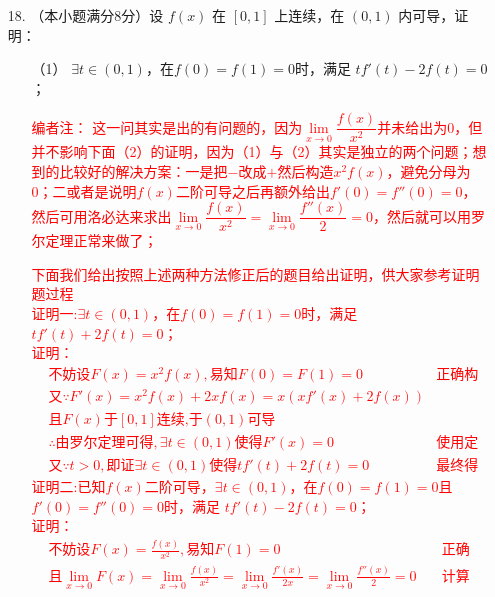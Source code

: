 \documentclass[a4paper,12pt]{article}
\begin{document}
\begin{enumerate}
    \item[18.]（本小题满分8分）设 \( f(x) \) 在 \( [0, 1] \) 上连续，在 \( (0, 1) \) 内可导，证明：

    \begin{enumerate}
        \item[（1）]\(\exists t \in (0, 1) \)，在\( f(0) = f(1) = 0\)时，满足 \( tf'(t)-2f(t) = 0 \)；
        \item[]\textcolor{red}{编者注： 这一问其实是出的有问题的，因为$\underset{x \to 0}{\lim}\dfrac{f(x)}{x^2}$并未给出为0，但并不影响下面（2）的证明，因为（1）与（2）其实是独立的两个问题；想到的比较好的解决方案：一是把$-$改成$+$然后构造$x^2f(x)$，避免分母为0；二或者是说明$f(x)$二阶可导之后再额外给出$f'(0) = f''(0) = 0$，然后可用洛必达来求出$\underset{x \to 0}{\lim}\dfrac{f(x)}{x^2}=\underset{x \to 0}{\lim}\dfrac{f''(x)}{2}=0$，然后就可以用罗尔定理正常来做了；}\\
        \item[] \textcolor{red}{
            下面我们给出按照上述两种方法修正后的题目给出证明，供大家参考证明题过程 \\[1em]
            证明一:\(\exists t \in (0, 1) \)，在\( f(0) = f(1) = 0\)时，满足 \( tf'(t)+2f(t) = 0 \)；\\
            证明：
            \begin{align*}
            &\text{不妨设} F(x)=x^2f(x), \text{易知} F(0)=F(1)=0 \quad & \text{正确构造，2分}\\
            &\text{又} \because F'(x)=x^2f(x)+2xf(x)=x(xf'(x)+2f(x)) \\
            &\text{且} F(x)\text{于}[0,1]\text{连续,} \text{于}(0,1)\text{可导}  \\
            &\therefore\text{由罗尔定理可得},\exists t \in (0, 1) \text{使得}F'(x)=0 \quad & \text{使用定理，3分}\\ 
            &\text{又} \because t>0,\text{即证} \exists t \in (0, 1)\text{使得}tf'(t)+2f(t) = 0\quad & \text{最终得证，4分}
            \end{align*}
            证明二:已知\(f(x)\)二阶可导，\(\exists t \in (0, 1) \)，在\( f(0) = f(1) = 0\)且\( f'(0) = f''(0) = 0\)时，满足 \( tf'(t)-2f(t) = 0 \)；\\
            证明：
            \begin{align*}
            &\text{不妨设} F(x)=\frac{f(x)}{x^2}, \text{易知} F(1)=0 \quad & \text{正确构造，1分}\\
            &\text{且} \underset{x \to 0}{\lim}F(x)=\underset{x \to 0}{\lim}\frac{f(x)}{x^2}=\underset{x \to 0}{\lim}\frac{f'(x)}{2x}=\underset{x \to 0}{\lim}\frac{f''(x)}{2}=0 \quad & \text{计算极限，2分}\\

\end{align*}}
\end{enumerate}
\end{enumerate}
\end{document}
